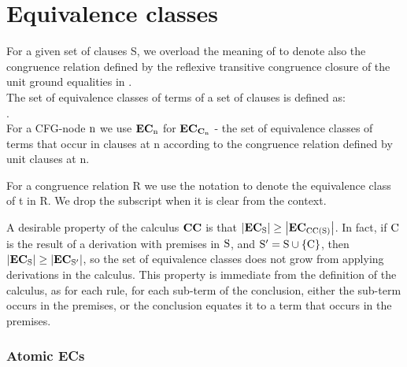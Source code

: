 %


\section*{Equivalence classes}
For a given set of clauses S, we overload the meaning of  to denote also the congruence relation defined by the reflexive transitive congruence closure of the unit ground equalities in .\\
The set of equivalence classes of terms of a set of clauses is defined as:\\
.\\
For a CFG-node $\mathrm{n}$ we use $\mathrm{\mathbf{EC}_{n}}$ for $\mathrm{\mathbf{EC}_{\mathbf{C}_{\mathrm{n}}}}$ - the set of equivalence classes of terms that occur in clauses at n according to the congruence relation defined by unit clauses at n.

For a congruence relation R we use the notation  to denote the equivalence class of t in R. We drop the subscript when it is clear from the context.

\noindent
A desirable property of the calculus $\mathrm{\mathbf{CC}}$ is that
$\left|\mathrm{\mathrm{\mathbf{EC}_{S}}}\right| \geq \left|\mathrm{\mathrm{\mathbf{EC}_{CC(S)}}}\right|$.
In fact, if $\mathrm{C}$ is the result of a derivation with premises in $\mathrm{S}$, and $\mathrm{S'=S \cup \left\{\mathrm{C}\right\}}$, then $\left|\mathrm{\mathrm{\mathbf{EC}_{S}}}\right| \geq \left|\mathrm{\mathrm{\mathbf{EC}_{S'}}}\right|$, so the set of equivalence classes does not grow from applying derivations in the calculus.
This property is immediate from the definition of the calculus, as for each rule, for each sub-term of the conclusion, either the sub-term occurs in the premises, or the conclusion equates it to a term that occurs in the premises.

\noindent
\subsubsection*{Atomic ECs}

